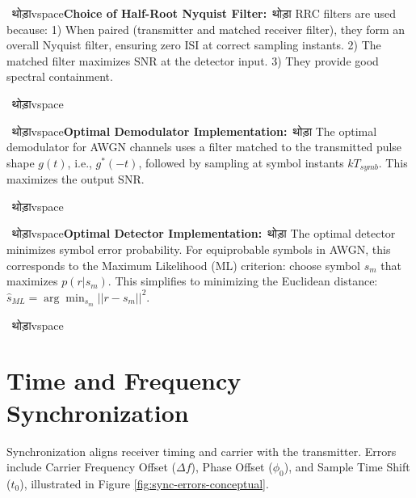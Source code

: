 \documentclass[11pt]{article}
\newenvironment{projectquestion}[1]
{\par\ थोड़ाvspace{\topsep}\noindent\textbf{#1}\ थोड़ा\quad\ignorespaces}
{\par\ थोड़ाvspace{\topsep}}
\begin{document}
			\begin{projectquestion}{Choice of Half-Root Nyquist Filter:}
				RRC filters are used because: 1) When paired (transmitter and matched receiver filter), they form an overall Nyquist filter, ensuring zero ISI at correct sampling instants. 2) The matched filter maximizes SNR at the detector input. 3) They provide good spectral containment.
			\end{projectquestion}
			
			\begin{projectquestion}{Optimal Demodulator Implementation:}
				The optimal demodulator for AWGN channels uses a filter matched to the transmitted pulse shape $g(t)$, i.e., $g^*(-t)$, followed by sampling at symbol instants $kT_{symb}$. This maximizes the output SNR.
			\end{projectquestion}
			
			\begin{projectquestion}{Optimal Detector Implementation:}
				The optimal detector minimizes symbol error probability. For equiprobable symbols in AWGN, this corresponds to the Maximum Likelihood (ML) criterion: choose symbol $s_m$ that maximizes $p(r|s_m)$. This simplifies to minimizing the Euclidean distance: $\hat{s}_{ML} = \arg\min_{s_m} ||r - s_m||^2$.
			\end{projectquestion}
			
			\section{Time and Frequency Synchronization}
			Synchronization aligns receiver timing and carrier with the transmitter. Errors include Carrier Frequency Offset ($\Delta f$), Phase Offset ($\phi_0$), and Sample Time Shift ($t_0$), illustrated in Figure \ref{fig:sync-errors-conceptual}.
			
\end{document}
